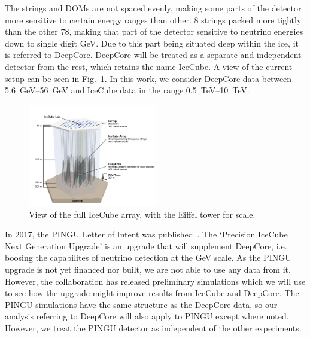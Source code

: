 The strings and DOMs are not spaced evenly, making some parts of the detector more sensitive to certain energy ranges than other.
8 strings packed more tightly than the other 78, making that part of the detector sensitive to neutrino energies down to single digit \si{\GeV}. Due to 
this part being situated deep within the ice, it is referred to DeepCore. DeepCore will be treated as a separate and independent detector from the rest, which
retains the name IceCube. A view of the current setup can be seen in Fig.~\ref{fig:array}. In this work, we consider DeepCore data between \SIrange{5.6}{56}{\GeV} and IceCube data in the range \SIrange{0.5}{10}{\TeV}.
\begin{figure}\label{fig:array}
    \centering
    \includegraphics[width=0.5\textwidth]{figures/icecube2.png}
    \caption{View of the full IceCube array, with the Eiffel tower for scale.}
\end{figure}

In 2017, the PINGU Letter of Intent was published~\cite{PINGUletter}. The `Precision IceCube Next Generation Upgrade' is an upgrade that will 
supplement DeepCore, i.e. boosing the capabilites of neutrino detection at the \si{\GeV} scale. As the PINGU upgrade is not yet financed nor built, we are
not able to use any data from it. However, the collaboration has released preliminary simulations which we will use to see how the upgrade might improve
results from IceCube and DeepCore. The PINGU simulations have the same structure as the DeepCore data, so our analysis referring to DeepCore will
also apply to PINGU except where noted. However, we treat the PINGU detector as independent of the other experiments.

